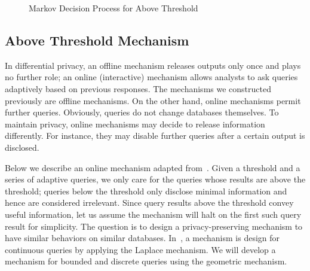 \begin{figure}
{
    }
  \caption{Markov Decision Process for Above Threshold}
  \label{figure:mdp-above-threshold}
\end{figure}

\subsection{Above Threshold Mechanism}
\label{subsec:threshold}
In differential privacy, an offline mechanism releases outputs only
once and plays no further role; an online (interactive) mechanism
allows analysts to ask queries adaptively based on previous
responses. The mechanisms we constructed previously are offline
mechanisms. On the other hand, online mechanisms permit further queries. 
Obviously, queries do not change databases themselves. To maintain
privacy, online mechanisms may decide to release
information differently. For instance, they may disable further
queries after a certain output is disclosed.

Below we describe an online mechanism adapted from~\cite{DR:14:AFDP}.
Given a threshold and a series of adaptive queries, we only care for
the queries whose results are above the threshold; queries below the
threshold only disclose minimal information and hence are considered
irrelevant. Since query results above the threshold convey useful
information, let us assume the mechanism will halt on the first such
query result for simplicity. The question is to design a
privacy-preserving mechanism to have similar behaviors on similar
databases. In~\cite{DR:14:AFDP}, a mechanism is design for continuous
queries by applying the Laplace mechanism. We will develop a mechanism
for bounded and discrete queries using the geometric mechanism.

